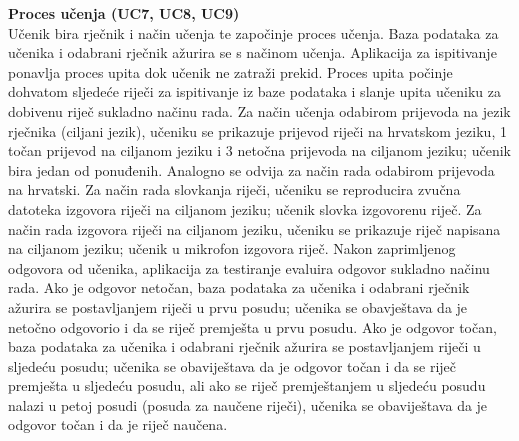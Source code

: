 				\textbf{Proces učenja (UC7, UC8, UC9)}\\
					{Učenik bira rječnik i način učenja te započinje proces učenja. Baza podataka za učenika i odabrani rječnik ažurira se s načinom učenja. Aplikacija za ispitivanje ponavlja proces upita dok učenik ne zatraži prekid. Proces upita počinje dohvatom sljedeće riječi za ispitivanje iz baze podataka i slanje upita učeniku za dobivenu riječ sukladno načinu rada. Za način učenja odabirom prijevoda na jezik rječnika (ciljani jezik), učeniku se prikazuje prijevod riječi na hrvatskom jeziku, 1 točan prijevod na ciljanom jeziku i 3 netočna prijevoda na ciljanom jeziku; učenik bira jedan od ponuđenih. Analogno se odvija za način rada odabirom prijevoda na hrvatski. Za način rada slovkanja riječi, učeniku se reproducira zvučna datoteka izgovora riječi na ciljanom jeziku; učenik slovka izgovorenu riječ. Za način rada izgovora riječi na ciljanom jeziku, učeniku se prikazuje riječ napisana na ciljanom jeziku; učenik u mikrofon izgovora riječ. Nakon zaprimljenog odgovora od učenika, aplikacija za testiranje evaluira odgovor sukladno načinu rada. Ako je odgovor netočan, baza podataka za učenika i odabrani rječnik ažurira se postavljanjem riječi u prvu posudu; učenika se obavještava da je netočno odgovorio i da se riječ premješta u prvu posudu. Ako je odgovor točan, baza podataka za učenika i odabrani rječnik ažurira se postavljanjem riječi u sljedeću posudu; učenika se obaviještava da je odgovor točan i da se riječ premješta u sljedeću posudu, ali ako se riječ premještanjem u sljedeću posudu nalazi u petoj posudi (posuda za naučene riječi), učenika se obaviještava da je odgovor točan i da je riječ naučena.}
				
